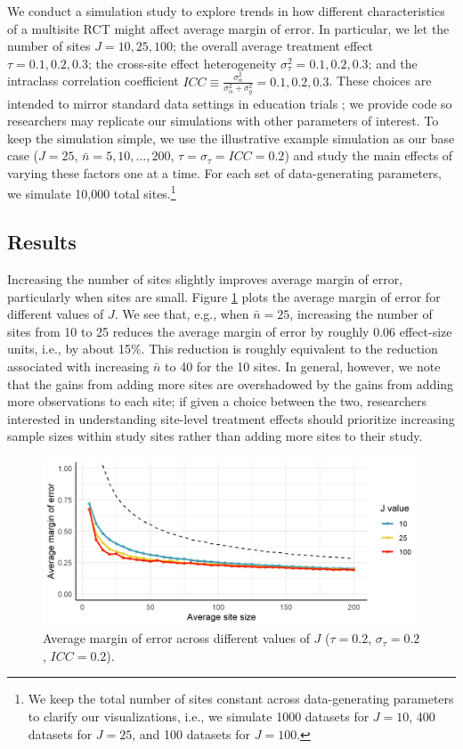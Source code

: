 \documentclass[]{article}
\begin{document}
We conduct a simulation study to explore trends in how different characteristics of a multisite RCT might affect average margin of error.
In particular, we let the number of sites $J = 10, 25, 100$; the overall average treatment effect $\tau = 0.1, 0.2, 0.3$; the cross-site effect heterogeneity $\sigma^2_\tau = 0.1, 0.2, 0.3$; and the intraclass correlation coefficient $ICC \equiv \frac{\sigma^2_\alpha}{\sigma^2_\alpha + \sigma^2_y} = 0.1, 0.2, 0.3$.
These choices are intended to mirror standard data settings in education trials \citep{weiss2017much};
we provide code so researchers may replicate our simulations with other parameters of interest.
To keep the simulation simple, we use the illustrative example simulation as our base case ($J=25$, $\bar{n}=5,10,\dots,200$, $\tau=\sigma_\tau=ICC=0.2$) and study the main effects of varying these factors one at a time.
For each set of data-generating parameters, we simulate 10,000 total sites.\footnote{We keep the total number of sites constant across data-generating parameters to clarify our visualizations, i.e., we simulate 1000 datasets for $J=10$, 400 datasets for $J=25$, and 100 datasets for $J=100$.}

\subsection{Results}

Increasing the number of sites slightly improves average margin of error, particularly when sites are small.
Figure \ref{fig:results_J} plots the average margin of error for different values of $J$.
We see that, e.g., when $\bar{n}=25$, increasing the number of sites from 10 to 25 reduces the average margin of error by roughly 0.06 effect-size units, i.e., by about 15\%.
This reduction is roughly equivalent to the reduction associated with increasing $\bar{n}$ to 40 for the 10 sites.
In general, however, we note that the gains from adding more sites are overshadowed by the gains from adding more observations to each site;
if given a choice between the two, researchers interested in understanding site-level treatment effects should prioritize increasing sample sizes within study sites rather than adding more sites to their study.
\begin{figure}[ht]
	\centering
	\includegraphics[width=\textwidth]{simstudy_J_length}
	\caption{Average margin of error across different values of $J$ ($\tau=0.2$, $\sigma_\tau=0.2$, $ICC=0.2$).}
	\label{fig:results_J}
\end{figure}
\end{document}
